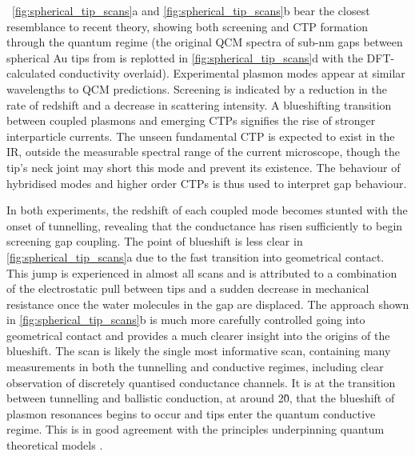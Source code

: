\documentclass[a4paper, 11pt]{article}
\begin{document}
\figurenames~\ref{fig:spherical_tip_scans}a and \ref{fig:spherical_tip_scans}b bear the closest resemblance to recent theory, showing both screening and CTP formation through the quantum regime (the original QCM spectra of sub-nm gaps between spherical Au tips from \cite{savage2012} is replotted in \autoref{fig:spherical_tip_scans}d with the DFT-calculated conductivity overlaid). Experimental plasmon modes appear at similar wavelengths to QCM predictions. Screening is indicated by a reduction in the rate of redshift and a decrease in scattering intensity. A blueshifting transition between coupled plasmons and emerging CTPs signifies the rise of stronger interparticle currents. The unseen fundamental CTP is expected to exist in the IR, outside the measurable spectral range of the current microscope, though the tip's neck joint may short this mode and prevent its existence. The behaviour of hybridised modes and higher order CTPs is thus used to interpret gap behaviour.

In both experiments, the redshift of each coupled mode becomes stunted with the onset of tunnelling, revealing that the conductance has risen sufficiently to begin screening gap coupling. The point of blueshift is less clear in \autoref{fig:spherical_tip_scans}a due to the fast transition into geometrical contact. This jump is experienced in almost all scans and is attributed to a combination of the electrostatic pull between tips and a sudden decrease in mechanical resistance once the water molecules in the gap are displaced. The approach shown in \autoref{fig:spherical_tip_scans}b is much more carefully controlled going into geometrical contact and provides a much clearer insight into the origins of the blueshift. The scan is likely the single most informative scan, containing many measurements in both the tunnelling and conductive regimes, including clear observation of discretely quantised conductance channels. It is at the transition between tunnelling and ballistic conduction, at around 2\G0, that the blueshift of plasmon resonances begins to occur and tips enter the quantum conductive regime. This is in good agreement with the principles underpinning quantum theoretical models \cite{zuloaga2009}.
\end{document}
